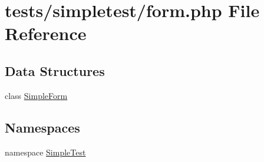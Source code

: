 \hypertarget{form_8php}{\section{tests/simpletest/form.php File Reference}
\label{form_8php}
}
\subsection*{Data Structures}
\begin{DoxyCompactItemize}
\item 
class \hyperlink{class_simple_form}{Simple\-Form}
\end{DoxyCompactItemize}
\subsection*{Namespaces}
\begin{DoxyCompactItemize}
\item 
namespace \hyperlink{namespace_simple_test}{Simple\-Test}
\end{DoxyCompactItemize}
